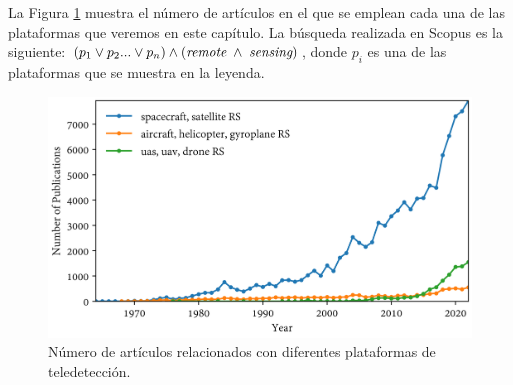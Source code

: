La Figura \ref{fig:scopus_search_platforms_spanish} muestra el número de artículos en el que se emplean cada una de las plataformas que veremos en este capítulo. La búsqueda realizada en Scopus es la siguiente: $(p_1 \lor p_2 ... \lor p_n) \land (\textit{remote} \hspace{1mm} \land \hspace{1mm} \textit{sensing})$, donde $p_i$ es una de las plataformas que se muestra en la leyenda.

\begin{figure}[ht]
	\includegraphics[width=\linewidth]{figs/introduction/platform_timeline.png}
	\caption{Número de artículos relacionados con diferentes plataformas de teledetección. }
    \label{fig:scopus_search_platforms_spanish}
\end{figure}


